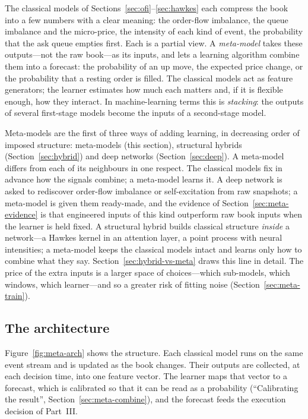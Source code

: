 The classical models of Sections~\ref{sec:ofi}--\ref{sec:hawkes} each compress the book into a few numbers
with a clear meaning: the order-flow imbalance, the queue imbalance and the micro-price, the intensity of
each kind of event, the probability that the ask queue empties first. Each is a partial view. A
\emph{meta-model} takes these outputs---not the raw book---as its inputs, and lets a learning algorithm
combine them into a forecast: the probability of an up move, the expected price change, or the probability
that a resting order is filled. The classical models act as feature generators; the learner estimates how
much each matters and, if it is flexible enough, how they interact. In
machine-learning terms this is \emph{stacking}: the outputs of several first-stage models become the inputs
of a second-stage model.

Meta-models are the first of three ways of adding learning, in decreasing order of imposed structure:
meta-models (this section), structural hybrids (Section~\ref{sec:hybrid}) and deep networks
(Section~\ref{sec:deep}). A meta-model differs from each of its neighbours in one respect. The classical
models fix in advance how the signals combine; a meta-model learns it. A deep network is asked to
rediscover order-flow imbalance or self-excitation from raw snapshots; a meta-model is given them
ready-made, and the evidence of Section~\ref{sec:meta-evidence} is that engineered inputs of this kind
outperform raw book inputs when the learner is held fixed. A structural hybrid builds classical structure
\emph{inside} a network---a Hawkes kernel in an attention layer, a point process with neural intensities;
a meta-model keeps the classical models intact and learns only how to combine what they say. Section~\ref{sec:hybrid-vs-meta} draws this line in detail. The price of
the extra inputs is a larger space of choices---which sub-models, which windows, which learner---and so a
greater risk of fitting noise (Section~\ref{sec:meta-train}).

\subsection{The architecture}
\label{sec:meta-arch}

Figure~\ref{fig:meta-arch} shows the structure. Each classical model runs on the same event stream and is
updated as the book changes. Their outputs are collected, at each decision time, into one feature vector.
The learner maps that vector to a forecast, which is calibrated so that it can be read as a probability
(``Calibrating the result'', Section~\ref{sec:meta-combine}), and the forecast feeds the execution decision of Part~III.

